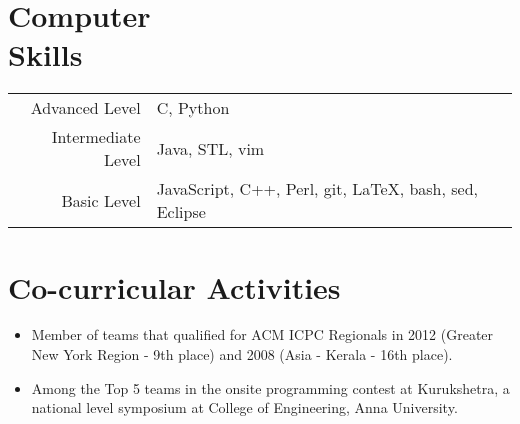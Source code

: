 \documentclass [margin] {res}
\begin{document}
\begin{resume}
\begin{itemize}
		 \end{itemize}

	
\section{Computer \\ Skills}
   \begin{tabular}{rl p{3in}}
   Advanced Level & C, Python \\
   Intermediate Level & Java, STL, vim \\
   Basic Level & JavaScript, C++, Perl, git, LaTeX, bash, sed, Eclipse \\
\end{tabular}


\section{Co-curricular Activities}
\begin{itemize} \itemsep -2pt
\item Member of teams that qualified for ACM ICPC Regionals in 2012 (Greater New York Region - 9th place) and 2008 (Asia - Kerala - 16th place).
\item Among the Top 5 teams in the onsite programming contest at Kurukshetra, a national level symposium at College of Engineering, Anna University.
\end{itemize}

\end{resume} 
\end{document}
